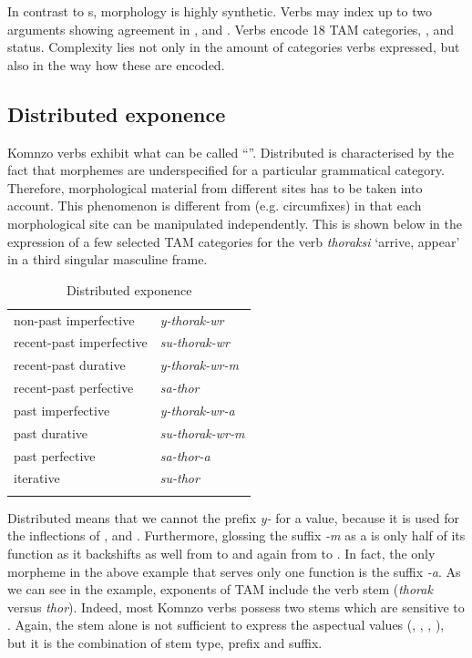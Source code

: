 In contrast to s,  morphology is highly synthetic. Verbs may index up to two arguments showing agreement in ,  and . Verbs encode 18 TAM categories, ,  and  status. Complexity lies not only in the amount of categories verbs expressed, but also in the way how these are encoded.

\subsection{Distributed exponence}

Komnzo verbs exhibit what can be called ``''. Distributed  is characterised by the fact that morphemes are underspecified for a particular grammatical category. Therefore, morphological material from different sites has to be taken into account. This phenomenon is different from  (e.g. circumfixes) in that each morphological site can be manipulated independently. This is shown below in the expression of a few selected TAM categories for the verb \emph{thoraksi} `arrive, appear' in a third singular masculine frame.

\begin{table}
\caption{Distributed exponence}
\label{thoraksi}
	\begin{tabularx}{.66\textwidth}{Xl}
	\lsptoprule
		non-past imperfective & \emph{y-thorak-wr}\\
		recent-past imperfective & \emph{su-thorak-wr}\\
		recent-past durative & \emph{y-thorak-wr-m}\\
		recent-past perfective & \emph{sa-thor}\\
		past imperfective & \emph{y-thorak-wr-a}\\
		past durative & \emph{su-thorak-wr-m}\\
		past perfective & \emph{sa-thor-a}\\
		iterative & \emph{su-thor}\\
		\lspbottomrule
	\end{tabularx}
\end{table}

Distributed  means that we cannot  the prefix \emph{y-} for a  value, because it is used for the inflections of ,  and . Furthermore, glossing the suffix \emph{-m} as a  is only half of its function as it backshifts  as well from  to  and again from  to  . In fact, the only morpheme in the above example that serves only one function is the  suffix \emph{-a}. As we can see in the example, exponents of TAM include the verb stem (\emph{thorak} versus \emph{thor}). Indeed, most Komnzo verbs possess two stems which are sensitive to . Again, the stem alone is not sufficient to express the aspectual values (, , , ), but it is the combination of stem type, prefix and suffix.%

